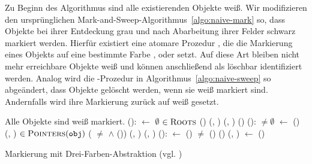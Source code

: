 Zu Beginn des Algorithmus sind alle existierenden Objekte weiß.
Wir modifizieren den ursprünglichen Mark-and-Sweep-Algorithmus~\ref{algo:naive-mark} so, dass Objekte bei ihrer Entdeckung grau und nach Abarbeitung ihrer Felder schwarz markiert werden.
Hierfür existiert eine atomare Prozedur , die die Markierung eines Objekts auf eine bestimmte Farbe ,  oder  setzt.
Auf diese Art bleiben nicht mehr erreichbare Objekte weiß und können anschließend als löschbar identifiziert werden.
Analog wird die -Prozedur in Algorithmus~\ref{algo:naive-sweep} so abgeändert, dass Objekte gelöscht werden, wenn sie weiß markiert sind.
Andernfalls wird ihre Markierung zurück auf weiß gesetzt.

\begin{algorithm}[h]
\begin{algorithmic}[1]
	\Pre Alle Objekte sind weiß markiert.
	\State {}():
	\State \quad {} $\gets$ $\emptyset$				
	\State \quad \FOREACH {} $\in \textsc{Roots}$
	\State \quad \quad \IF {}()
	\State \quad \quad \quad {}(, )	
	\State \quad \quad \quad {}(, )	
	\State \quad \quad \quad {}()
	\Statex
	\State {}():
	\State \quad \WHILE {} $\neq \emptyset$
	\State \quad \quad {} $\gets$ ()
	\State \quad \quad {}(, )		
	\State \quad \quad \FOREACH {} $\in \textsc{Pointers}(\texttt{obj})$
	\State \quad \quad \quad \IF ( $\neq$ \Null $\wedge$ ())	
	\State \quad \quad \quad \quad {}(, )	
	\State \quad \quad \quad \quad {}(, )
	\Statex
	\State {}():
	\State \quad {} $\gets$ ()
	\State \quad \WHILE {} $\neq$ \Null
	\State \quad \quad \IF {}()
	\State \quad \quad \quad {}()
	\State \quad \quad \ELSE {}(, )
	\State \quad \quad {} $\gets$ ()
\end{algorithmic}
\caption[Markierung mit Drei-Farben-Abstraktion]{Markierung mit Drei-Farben-Abstraktion (vgl. \cite[S. 970]{dijkstra1978})}
\label{algo:tricolor}
\end{algorithm}

